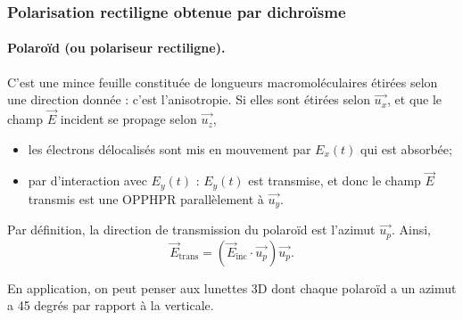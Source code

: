 \subsubsection{Polarisation rectiligne obtenue par dichroïsme}
\paragraph{Polaroïd (ou polariseur rectiligne).} C'est une mince feuille constituée de longueurs macromoléculaires étirées selon une direction donnée : c'est l'anisotropie. Si elles sont étirées selon $\vec{u_x}$, et que le champ $\vec{E}$ incident se propage selon $\vec{u_z}$,
\begin{itemize}
    \item les électrons délocalisés sont mis en mouvement par $E_x(t)$ qui est absorbée;
    \item par d'interaction avec $E_y(t)$ : $E_y(t)$ est transmise, et donc le champ $\vec{E}$ transmis est une OPPHPR parallèlement à $\vec{u_y}$.
\end{itemize}

Par définition, la direction de transmission du polaroïd est l'azimut $\vec{u_p}$. Ainsi, 
\begin{equation*}
    \boxed{
        \vec{E}_{\mathrm{trans}}=\left(\vec{E}_{\mathrm{inc}}\cdot\vec{u_p}\right)\vec{u_p}.
    }
\end{equation*}

En application, on peut penser aux lunettes 3D dont chaque polaroïd a un azimut a 45 degrés par rapport à la verticale.